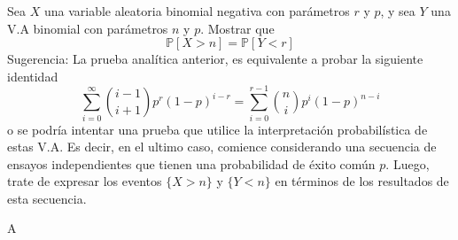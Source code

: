 	\question
		Sea $X$ una variable aleatoria binomial negativa con parámetros $r$ y $p$, y sea $Y$ una V.A binomial con parámetros $n$ y $p$. Mostrar que
		\begin{equation*}
			\mathds{P}[X>n]=\mathds{P}[Y<r]
		\end{equation*}
		Sugerencia: La prueba analítica anterior, es equivalente a probar la siguiente identidad
		\begin{equation*}
			\sum_{i=0}^{\infty}\binom{i-1}{i+1}p^{r}{(1-p)}^{i-r}=\sum_{i=0}^{r-1}\binom{n}{i}p^{i}{(1-p)}^{n-i}
		\end{equation*}
		o se podría intentar una prueba que utilice la interpretación probabilística de estas V.A. Es decir, en el ultimo caso, comience considerando una secuencia de ensayos independientes que tienen una probabilidad de éxito común $p$. Luego, trate de expresar los eventos $\{X > n\}$ y $\{Y < n\}$ en términos de los resultados de esta secuencia.

		\begin{solutionorbox}
			A
		\end{solutionorbox}